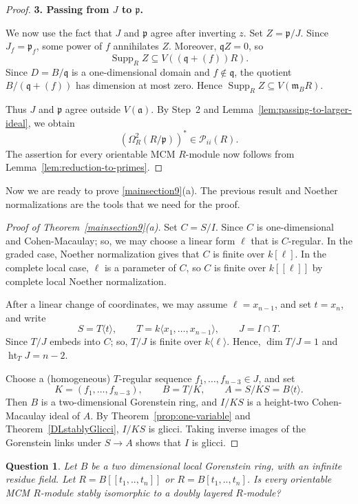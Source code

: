 \documentclass[11pt,letterpaper]{amsart}
\theoremstyle{plain}
\newtheorem{question}[thm]{Question}
\theoremstyle{definition}
\theoremstyle{remark}
\begin{document}
\begin{proof}
\smallskip \noindent\textbf{3. Passing from $J$ to $\mathfrak p$.}

We now use the fact that $J$ and $\mathfrak p$ agree after inverting $z$. 
Set $Z=\mathfrak p/J$. Since $J_f=\mathfrak p_f$,
some power of $f$ annihilates $Z$. Moreover,
$\mathfrak qZ=0$, so
\[
\operatorname{Supp}_R Z
\subseteq V((\mathfrak q+(f))R).
\]
Since $D=B/\mathfrak q$ is a one-dimensional domain
and $f\notin\mathfrak q$, the quotient
$B/(\mathfrak q+(f))$ has dimension at most zero.
Hence $\operatorname{Supp}_R Z\subseteq V(\mathfrak m_BR)$.


Thus $J$ and $\mathfrak p$ agree outside $V(\mathfrak a)$. By Step~2 and Lemma~\ref{lem:passing-to-larger-ideal}, we obtain \[ (\Omega_R^2(R/\mathfrak p))^* \in\mathcal P_{ii}(R). \] The assertion for every orientable MCM $R$-module now follows from Lemma~\ref{lem:reduction-to-primes}.
\end{proof}

Now we are ready to prove \ref{mainsection9}(a). The previous result and Noether normalizations are the tools that we need for the proof.

\begin{proof}[Proof of Theorem~\ref{mainsection9}\textup{(a)}]
Set $C=S/I$. Since $C$ is one-dimensional and
Cohen-Macaulay; so, we may choose a linear form $\ell$
that is $C$-regular. In the graded case, Noether
normalization gives that $C$ is finite over $k[\ell]$.
In the complete local case, $\ell$ is a parameter
of $C$, so $C$ is finite over $k[[\ell]]$ by
complete local Noether normalization.

After a linear change of coordinates, we may assume
$\ell=x_{n-1}$, and set $t=x_n$, and write
\[
S=T\langle t\rangle,\qquad
T=k\langle x_1,\ldots,x_{n-1}\rangle,
\qquad J=I\cap T.
\]
Since $T/J$ embeds into $C$; so, $T/J$ is finite over
$k\langle\ell\rangle$. Hence, $\dim T/J=1$ and
$\operatorname{ht}_T J=n-2$.

Choose a (homogeneous) $T$-regular sequence
$f_1,\ldots,f_{n-3}\in J$, and set
\[
K=(f_1,\ldots,f_{n-3}),\qquad
B=T/K,\qquad A=S/KS=B\langle t\rangle.
\]
Then $B$ is a two-dimensional Gorenstein ring,
and $I/KS$ is a height-two Cohen-Macaulay
ideal of $A$. By Theorem~\ref{prop:one-variable} and
Theorem~\ref{DLstablyGlicci}, $I/KS$ is glicci.
Taking inverse images of the Gorenstein links
under $S\to A$ shows that $I$ is glicci.
\end{proof}


\begin{question}\label{DLextensionvariablequestion}
    Let $B$ be a two dimensional local Gorenstein ring, with an infinite residue field. Let $R=B[[t_1,..,t_n]]$ or $R=B[t_1,..,t_n]$. Is every orientable MCM $R$-module stably isomorphic to a doubly layered $R$-module?
\end{question}
\end{document}
